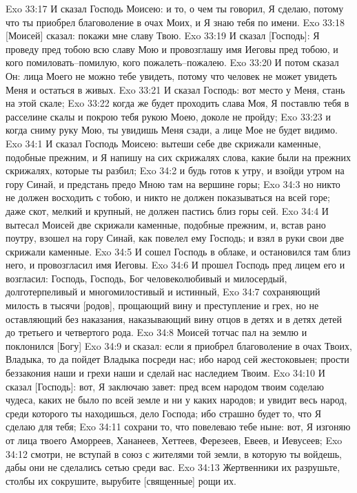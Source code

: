 Exo 33:17  И сказал Господь Моисею: и то, о чем ты говорил, Я сделаю, потому что ты приобрел благоволение в очах Моих, и Я знаю тебя по имени.
Exo 33:18  [Моисей] сказал: покажи мне славу Твою.
Exo 33:19  И сказал [Господь]: Я проведу пред тобою всю славу Мою и провозглашу имя Иеговы пред тобою, и кого помиловать--помилую, кого пожалеть--пожалею.
Exo 33:20  И потом сказал Он: лица Моего не можно тебе увидеть, потому что человек не может увидеть Меня и остаться в живых.
Exo 33:21  И сказал Господь: вот место у Меня, стань на этой скале;
Exo 33:22  когда же будет проходить слава Моя, Я поставлю тебя в расселине скалы и покрою тебя рукою Моею, доколе не пройду;
Exo 33:23  и когда сниму руку Мою, ты увидишь Меня сзади, а лице Мое не будет видимо.
Exo 34:1  И сказал Господь Моисею: вытеши себе две скрижали каменные, подобные прежним, и Я напишу на сих скрижалях слова, какие были на прежних скрижалях, которые ты разбил;
Exo 34:2  и будь готов к утру, и взойди утром на гору Синай, и предстань предо Мною там на вершине горы;
Exo 34:3  но никто не должен восходить с тобою, и никто не должен показываться на всей горе; даже скот, мелкий и крупный, не должен пастись близ горы сей.
Exo 34:4  И вытесал Моисей две скрижали каменные, подобные прежним, и, встав рано поутру, взошел на гору Синай, как повелел ему Господь; и взял в руки свои две скрижали каменные.
Exo 34:5  И сошел Господь в облаке, и остановился там близ него, и провозгласил имя Иеговы.
Exo 34:6  И прошел Господь пред лицем его и возгласил: Господь, Господь, Бог человеколюбивый и милосердый, долготерпеливый и многомилостивый и истинный,
Exo 34:7  сохраняющий милость в тысячи [родов], прощающий вину и преступление и грех, но не оставляющий без наказания, наказывающий вину отцов в детях и в детях детей до третьего и четвертого рода.
Exo 34:8  Моисей тотчас пал на землю и поклонился [Богу]
Exo 34:9  и сказал: если я приобрел благоволение в очах Твоих, Владыка, то да пойдет Владыка посреди нас; ибо народ сей жестоковыен; прости беззакония наши и грехи наши и сделай нас наследием Твоим.
Exo 34:10  И сказал [Господь]: вот, Я заключаю завет: пред всем народом твоим соделаю чудеса, каких не было по всей земле и ни у каких народов; и увидит весь народ, среди которого ты находишься, дело Господа; ибо страшно будет то, что Я сделаю для тебя;
Exo 34:11  сохрани то, что повелеваю тебе ныне: вот, Я изгоняю от лица твоего Аморреев, Хананеев, Хеттеев, Ферезеев, Евеев, и Иевусеев;
Exo 34:12  смотри, не вступай в союз с жителями той земли, в которую ты войдешь, дабы они не сделались сетью среди вас.
Exo 34:13  Жертвенники их разрушьте, столбы их сокрушите, вырубите [священные] рощи их.

